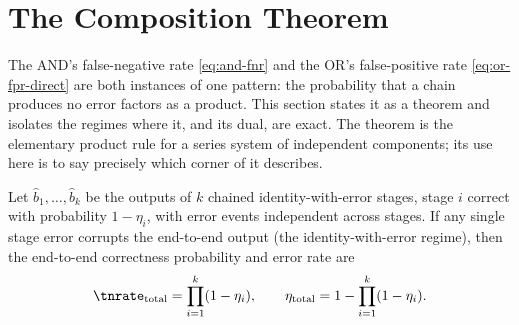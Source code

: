 %
%
%
%

\section{The Composition Theorem}
\label{sec:composition-theorem}

The AND's false-negative rate \eqref{eq:and-fnr} and the OR's false-positive
rate \eqref{eq:or-fpr-direct} are both instances of one pattern: the
probability that a chain produces no error factors as a product. This section
states it as a theorem and isolates the regimes where it, and its dual, are
exact. The theorem is the elementary product rule for a series system of
independent components; its use here is to say precisely which corner of
 it describes.

\begin{theorem}
\label{thm:composition}
Let $\hat{b}_1, \ldots, \hat{b}_k$ be the outputs of $k$ chained
identity-with-error stages, stage $i$ correct with probability $1 - \eta_i$,
with error events independent across stages. If any single stage error
corrupts the end-to-end output (the identity-with-error regime), then the
end-to-end correctness probability and error rate are
\begin{equation}
\label{eq:composition-correctness}
  \tnrate_{\mathrm{total}} = \prod_{i=1}^{k}(1 - \eta_i),
  \qquad
  \eta_{\mathrm{total}} = 1 - \prod_{i=1}^{k}(1 - \eta_i).
\end{equation}
\end{theorem}

